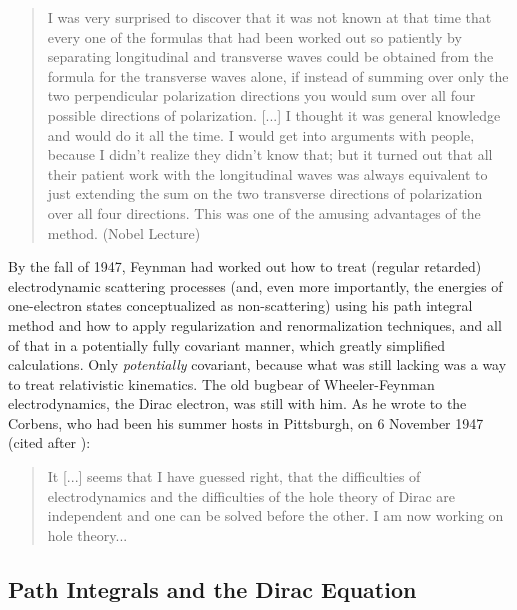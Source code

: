 \documentclass[12pt]{article}
\begin{document}
\begin{quote}
I was very surprised to discover that it was not known at that time that every one of the formulas that had been worked out so patiently by separating longitudinal and transverse waves could be obtained from the formula for the transverse waves alone, if instead of summing over only the two perpendicular polarization directions you would sum over all four possible directions of polarization. [...] I thought it was general knowledge and would do it all the time. I would get into arguments with people, because I didn't realize they didn't know that; but it turned out that all their patient work with the longitudinal waves was always equivalent to just extending the sum on the two transverse directions of polarization over all four directions. This was one of the amusing advantages of the method. (Nobel Lecture)
\end{quote}

By the fall of 1947, Feynman had worked out how to treat (regular retarded) electrodynamic scattering processes (and, even more importantly, the energies of one-electron states conceptualized as non-scattering) using his path integral method and how to apply regularization and renormalization techniques, and all of that in a potentially fully covariant manner, which greatly simplified calculations. Only \emph{potentially} covariant, because what was still lacking was a way to treat relativistic kinematics. The old bugbear of Wheeler-Feynman electrodynamics, the Dirac electron, was still with him. As he wrote to the Corbens, who had been his summer hosts in Pittsburgh, on 6 November 1947 (cited after \citep[p. 423]{schweber_1994_qed}):

\begin{quote}
It [...] seems that I have guessed right, that the difficulties of electrodynamics and the difficulties of the hole theory of Dirac are independent and one can be solved before the other. I am now working on hole theory...
\end{quote}

\subsection{Path Integrals and the Dirac Equation}
\end{document}
